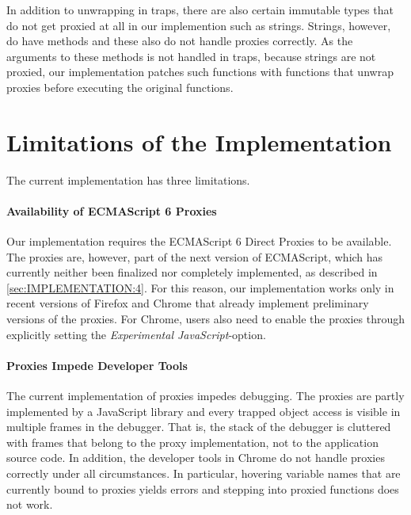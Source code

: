 In addition to unwrapping in traps, there are also certain immutable types that do not get proxied at all in our implemention such as strings.
Strings, however, do have methods and these also do not handle proxies correctly.
As the arguments to these methods is not handled in traps, because strings are not proxied, our implementation patches such functions with functions that unwrap proxies before executing the original functions.





\section{Limitations of the Implementation}

The current implementation has three limitations.

\paragraph{Availability of ECMAScript 6 Proxies}
Our implementation requires the ECMAScript 6 Direct Proxies to be available.
The proxies are, however, part of the next version of ECMAScript, which has currently neither been finalized nor completely implemented, as described in \ref{sec:IMPLEMENTATION:4}.
For this reason, our implementation works only in recent versions of Firefox and Chrome that already implement preliminary versions of the proxies.
For Chrome, users also need to enable the proxies through explicitly setting the \emph{Experimental JavaScript}-option.

\paragraph{Proxies Impede Developer Tools}
The current implementation of proxies impedes debugging.
The proxies are partly implemented by a JavaScript library and every trapped object access is visible in multiple frames in the debugger.
That is, the stack of the debugger is cluttered with frames that belong to the proxy implementation, not to the application source code.
In addition, the developer tools in Chrome do not handle proxies correctly under all circumstances.
In particular, hovering variable names that are currently bound to proxies yields errors and stepping into proxied functions does not work.

